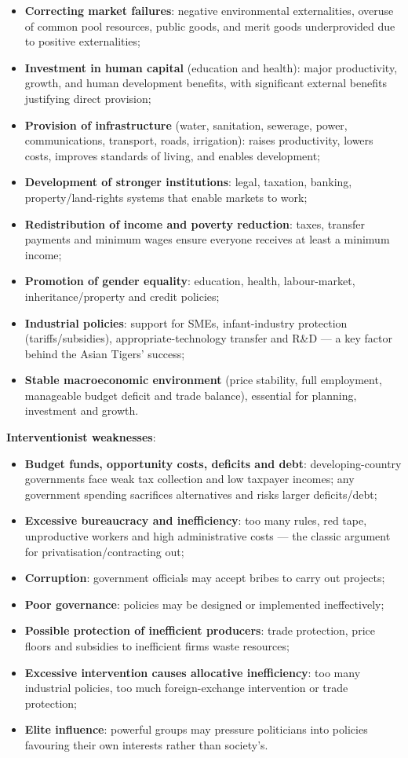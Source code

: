 \begin{itemize}
  \item \textbf{Correcting market failures}: negative environmental externalities, overuse of common pool resources, public goods, and merit goods underprovided due to positive externalities;
  \item \textbf{Investment in human capital} (education and health): major productivity, growth, and human development benefits, with significant external benefits justifying direct provision;
  \item \textbf{Provision of infrastructure} (water, sanitation, sewerage, power, communications, transport, roads, irrigation): raises productivity, lowers costs, improves standards of living, and enables development;
  \item \textbf{Development of stronger institutions}: legal, taxation, banking, property/land-rights systems that enable markets to work;
  \item \textbf{Redistribution of income and poverty reduction}: taxes, transfer payments and minimum wages ensure everyone receives at least a minimum income;
  \item \textbf{Promotion of gender equality}: education, health, labour-market, inheritance/property and credit policies;
  \item \textbf{Industrial policies}: support for SMEs, infant-industry protection (tariffs/subsidies), appropriate-technology transfer and R\&D --- a key factor behind the Asian Tigers' success;
  \item \textbf{Stable macroeconomic environment} (price stability, full employment, manageable budget deficit and trade balance), essential for planning, investment and growth.
\end{itemize}
\textbf{Interventionist weaknesses}:
\begin{itemize}
  \item \textbf{Budget funds, opportunity costs, deficits and debt}: developing-country governments face weak tax collection and low taxpayer incomes; any government spending sacrifices alternatives and risks larger deficits/debt;
  \item \textbf{Excessive bureaucracy and inefficiency}: too many rules, red tape, unproductive workers and high administrative costs --- the classic argument for privatisation/contracting out;
  \item \textbf{Corruption}: government officials may accept bribes to carry out projects;
  \item \textbf{Poor governance}: policies may be designed or implemented ineffectively;
  \item \textbf{Possible protection of inefficient producers}: trade protection, price floors and subsidies to inefficient firms waste resources;
  \item \textbf{Excessive intervention causes allocative inefficiency}: too many industrial policies, too much foreign-exchange intervention or trade protection;
  \item \textbf{Elite influence}: powerful groups may pressure politicians into policies favouring their own interests rather than society's.
\end{itemize}
